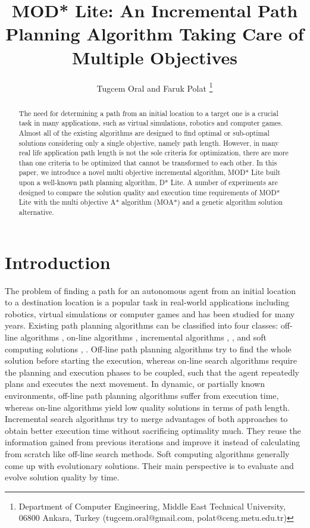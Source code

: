 \documentclass[10pt,journal]{IEEEtran}
\begin{document}
\title{MOD* Lite: An Incremental Path Planning Algorithm Taking Care of Multiple Objectives}

\author{Tugcem Oral and Faruk Polat
\thanks{Department of Computer Engineering, Middle East Technical University, 06800 Ankara, Turkey (tugcem.oral@gmail.com, polat@ceng.metu.edu.tr)}}

\maketitle

\begin{abstract}
The need for determining a path from an initial location to a target one is a crucial task in many applications, such as virtual simulations, robotics and computer games. Almost all of the existing algorithms are designed to find optimal or sub-optimal solutions considering only a single objective, namely path length.  However, in many real life application path length is not the sole criteria for optimization, there are more than one criteria to be optimized that cannot be transformed to each other. In this paper, we introduce  a novel multi objective incremental algorithm, MOD* Lite built upon a well-known path planning algorithm, D* Lite. A number of experiments are designed to compare the solution quality and execution time requirements of MOD* Lite with the multi objective A* algorithm (MOA*) and a genetic algorithm solution alternative.
\end{abstract}

\section{Introduction}
\label{chapter:introduction}

The problem of finding a path for an autonomous agent from an initial location to a destination location is a popular task in real-world applications including robotics, virtual simulations or computer games and has been studied for many years. Existing path planning algorithms can be classified into four classes: off-line algorithms \cite{Dijkstra:1959} \cite{AStarHart:1968}, on-line algorithms \cite{RTAStarKorf:1990}, incremental algorithms \cite{DStar:1994}, \cite{Koenig:2002}, \cite{FocussedDStarStentz:1995} and soft computing solutions \cite{Tarapata:2007}, \cite{Pangilinan}. Off-line path planning algorithms try to find the whole solution before starting the execution, whereas on-line search algorithms require the planning and execution phases to be coupled, such that the agent repeatedly plans and executes the next movement. In dynamic, or partially known environments, off-line path planning algorithms suffer from execution time, whereas on-line algorithms yield low quality solutions in terms of path length. Incremental search algorithms try to merge advantages of both approaches to obtain better execution time without sacrificing optimality much. They reuse the information gained from previous iterations and improve it instead of calculating from scratch like off-line search methods. Soft computing algorithms generally come up with evolutionary solutions. Their main perspective is to evaluate and evolve solution quality by time. 
\end{document}
